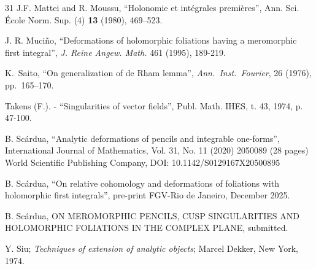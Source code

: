 \documentclass[11pt,a4paper]{amsart}
\theoremstyle{definition}
\begin{document}
\begin{thebibliography}{31}
 J.F. Mattei and R. Moussu,
 {  ``Holonomie et int\'egrales premi\`eres''}, Ann. Sci. \'Ecole Norm. 
 Sup. (4) {\bf 13} (1980), 469--523.



 J. R. Muciño, ``Deformations of holomorphic foliations having a meromorphic
first integral'',  {\it J. Reine Angew. Math.} 461 (1995), 189-219.


\bibitem{[Saito]} K.~Saito,
``On generalization of de Rham lemma'',
\emph{Ann.\ Inst.\ Fourier}, 26 (1976), pp.~165--170.



 Takens (F.). - ``Singularities of vector fields'', Publ. 
    Math. IHES, t. 43, 1974, p. 47-100.



 B. Scárdua, ``Analytic deformations of pencils and integrable one-forms'',  International Journal of Mathematics, Vol. 31, No. 11 (2020) 2050089 (28 pages) World Scientiﬁc Publishing Company, DOI: 10.1142/S0129167X20500895


 B. Scárdua, ``On relative cohomology and deformations of foliations with holomorphic 
first integrals'', pre-print FGV-Rio de Janeiro, December 2025.


 B. Scárdua, ON MEROMORPHIC PENCILS, CUSP SINGULARITIES AND HOLOMORPHIC FOLIATIONS IN THE COMPLEX PLANE, submitted. 

\bibitem{[Si]}  Y. Siu;  {\em Techniques of extension of analytic objects}; Marcel Dekker, New York, 1974.
\end{thebibliography}
\end{document}
